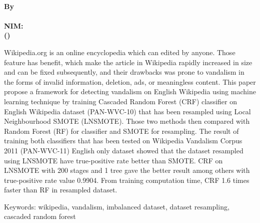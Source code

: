 \begin{center}
\textbf{\large
	\MakeUppercase{\mytitle{}} \\
	\bigskip
	\textnormal{By} \\
	\myname{} \\
	NIM: \mysid{} \\
	(\mydept{}) \\
}
\end{center}

\bigskip
\bigskip
\bigskip

Wikipedia.org is an online encyclopedia which can edited by anyone.
Those feature has benefit, which make the article in Wikipedia rapidly
increased in size and can be fixed subsequently, and their drawbacks was prone
to vandalism in the forms of invalid information, deletion, ads, or meaningless
content.
This paper propose a framework for detecting vandalism on English Wikipedia
using machine learning technique by training Cascaded Random Forest (CRF)
classifier on English Wikipedia dataset (PAN-WVC-10) that has been resampled
using Local Neighbourhood SMOTE (LNSMOTE).
Those two methods then compared with Random Forest (RF) for classifier and
SMOTE for resampling.
The result of training both classifiers that has been tested on Wikipedia
Vandalism Corpus 2011 (PAN-WVC-11) English only dataset showed that the dataset
resampled using LNSMOTE have true-positive rate better than SMOTE.
CRF on LNSMOTE with 200 stages and 1 tree gave the better result among others
with true-positive rate value 0.9904.
From training computation time, CRF 1.6 times faster than RF in resampled
dataset.

Keywords: wikipedia, vandalism, imbalanced dataset, dataset resampling,
cascaded random forest
